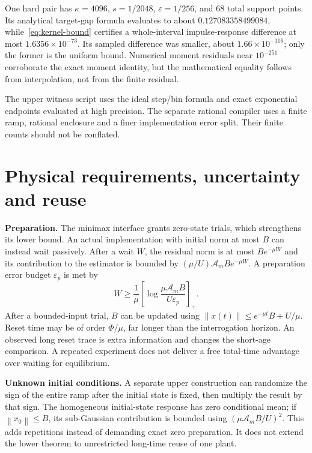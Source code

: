 \documentclass[11pt,a4paper]{article}
\newcommand{\norm}[1]{\left\lVert#1\right\rVert}
\begin{document}
One hard pair has $\kappa=4096$, $s=1/2048$, $\varepsilon=1/256$, and 68 total support points. Its analytical target-gap formula evaluates to about $0.127083358499084$, while~\eqref{eq:kernel-bound} certifies a whole-interval impulse-response difference at most $1.6356\times10^{-73}$. Its sampled difference was smaller, about $1.66\times10^{-116}$; only the former is the uniform bound. Numerical moment residuals near $10^{-251}$ corroborate the exact moment identity, but the mathematical equality follows from interpolation, not from the finite residual.

The upper witness script uses the ideal step/bin formula and exact exponential endpoints evaluated at high precision. The separate rational compiler uses a finite ramp, rational enclosure and a finer implementation error split. Their finite counts should not be conflated.

\section{Physical requirements, uncertainty and reuse}\label{sec:resources}

\textbf{Preparation.} The minimax interface grants zero-state trials, which strengthens its lower bound. An actual implementation with initial norm at most $B$ can instead wait passively. After a wait $W$, the residual norm is at most $Be^{-\mu W}$ and its contribution to the estimator is bounded by $(\mu/U)\mathcal A_mBe^{-\mu W}$. A preparation error budget $\varepsilon_p$ is met by
\begin{equation}
W\geq\frac1\mu\left[\log\frac{\mu\mathcal A_mB}{U\varepsilon_p}\right]_+.
\end{equation}
After a bounded-input trial, $B$ can be updated using $\norm{x(t)}\leq e^{-\mu t}B+U/\mu$. Reset time may be of order $\Phi/\mu$, far longer than the interrogation horizon. An observed long reset trace is extra information and changes the short-age comparison. A repeated experiment does not deliver a free total-time advantage over waiting for equilibrium.

\textbf{Unknown initial conditions.} A separate upper construction can randomize the sign of the entire ramp after the initial state is fixed, then multiply the result by that sign. The homogeneous initial-state response has zero conditional mean; if $\norm{x_0}\leq B$, its sub-Gaussian contribution is bounded using $(\mu\mathcal A_mB/U)^2$. This adds repetitions instead of demanding exact zero preparation. It does not extend the lower theorem to unrestricted long-time reuse of one plant.
\end{document}
